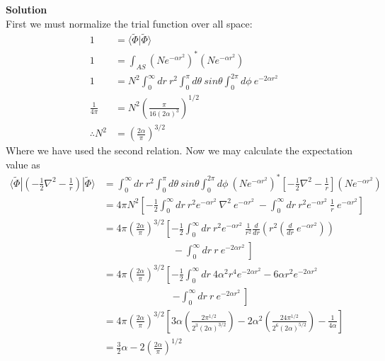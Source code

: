 \documentclass[12pt]{article}
\begin{document}
\vspace{10pt}
\textbf{Solution} \\[1em]
First we must normalize the trial function over all space:
\[
\begin{split}
    1 &= \langle \tilde{\Phi}|\tilde{\Phi}\rangle  \\[1em] 1 &= \int_{AS}  (N e^{-\alpha r^2})^* (N e^{-\alpha r^2})\\[1em] 1 & = N^2 \int_0^\infty dr \: r^2 \int_0^\pi d\theta \: sin \theta \int_0^{2\pi} d\phi \:  e^{-2\alpha r^2}\\[1em]
    \frac{1}{4\pi} & = N^2 \left(\frac{\pi}{16 (2\alpha)^{3}}\right)^{1/2}\\[1em]
    \therefore N^2 &= \left(\frac{2 \alpha}{\pi}\right)^{3/2}
\end{split}
\]
Where we have used the second relation. Now we may calculate the expectation value as 
\[
\begin{split}
    \langle \tilde{\Phi} |\left( -\frac{1}{2}\nabla^2 - \frac{1}{r} \right)|\tilde{\Phi}\rangle & = \int_0^\infty dr \: r^2 \int_0^\pi d\theta \: sin \theta \int_0^{2\pi} d\phi \: (N e^{-\alpha r^2})^* \left[-\frac{1}{2}\nabla^2 - \frac{1}{r}\right] (N e^{-\alpha r^2})\\[1em]
    & = 4 \pi N^2 \left[ -\frac{1}{2} \int_0^{\infty}dr \: r^2e^{-\alpha r^2} \:\nabla^2 \: e^{-\alpha r^2} \: -\int_0^{\infty} dr \: r^2e^{-\alpha r^2} \:\frac{1}{r} \: e^{-\alpha r^2}\right] \\[1em]
    & = 4 \pi \left(\frac{2 \alpha}{\pi}\right)^{3/2} \left[ -\frac{1}{2} \int_0^{\infty}dr \: r^2e^{-\alpha r^2} \:\frac{1}{r^{2}}\frac{d}{dr}
\left( r^2 \left( \frac{d}{dr} \: e^{-\alpha r^2}\right) \right)\right.\\[1em]
    &\qquad \qquad \qquad \quad - \left. \int_0^{\infty} dr \: r \: e^{-2\alpha r^2} \: \right] \\[1em]
    & = 4 \pi \left(\frac{2 \alpha}{\pi}\right)^{3/2} \left[ -\frac{1}{2} \int_0^{\infty}dr \:  4 \alpha^2 r^4 e^{-2\alpha r^2} - 6 \alpha r^2e^{-2\alpha r^2} \right. \\[1em]
    &\qquad \qquad \qquad \quad \left. -\int_0^{\infty} dr \: r \: e^{-2\alpha r^2} \: \right] \\[1em]
    & = 4 \pi \left(\frac{2 \alpha}{\pi}\right)^{3/2} \left[ 3 \alpha \left(  \frac{2\pi^{1/2}}{2^{3}(2\alpha)^{3/2}} \right) - 2 \alpha^2 \left( \frac{24 \pi^{1/2}}{2^{6}(2\alpha)^{5/2}}\right) - \frac{1}{4\alpha} \right] \\[1em]
    & = \frac{3}{2}\alpha - 2\left(\frac{2\alpha}{\pi}\right)^{1/2}
\end{split}
\]
\end{document}
